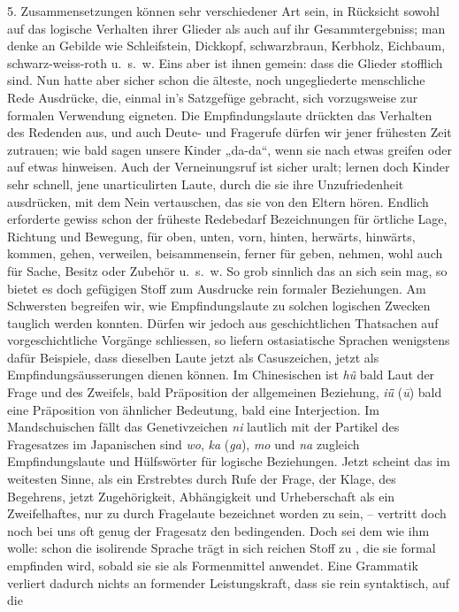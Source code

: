 \label{IV.III.II.4.5}5. Zusammensetzungen können sehr verschiedener Art sein, in Rücksicht sowohl auf das logische Verhalten ihrer Glieder  als \label{fp.329} auch auf ihr Gesammtergebniss; man denke an Gebilde wie Schleifstein, Dickkopf, schwarz\-\label{sp.347}braun, Kerbholz, Eichbaum, schwarz-weiss-roth u.~s.~w. Eins aber ist ihnen gemein: dass die Glieder  stofflich sind. Nun hatte aber sicher schon die älteste, noch ungegliederte menschliche Rede Ausdrücke, die, einmal in’s Satzgefüge gebracht, sich vorzugsweise zur formalen Verwendung eigneten. Die Empfindungslaute drückten das  Verhalten des Redenden aus, und auch Deute- und Fragerufe dürfen wir jener frühesten Zeit zutrauen; wie bald sagen unsere Kinder „da-da“, wenn sie nach etwas greifen oder auf etwas hinweisen. Auch der Verneinungsruf ist sicher uralt; lernen doch Kinder sehr schnell, jene unarticulirten Laute, durch die sie ihre Unzufriedenheit ausdrücken, mit dem Nein vertauschen, das sie von den Eltern hören. Endlich erforderte gewiss schon der früheste Redebedarf Bezeichnungen für örtliche Lage, Richtung und Bewegung, für oben, unten, vorn, hinten, herwärts, hinwärts, kommen, gehen, verweilen, beisammensein, ferner für geben, nehmen, wohl auch für Sache, Besitz oder Zubehör u.~s.~w. So grob sinnlich das an sich sein mag, so bietet es doch gefügigen Stoff zum Ausdrucke  rein formaler Beziehungen. Am Schwersten begreifen wir, wie Empfindungslaute zu solchen logischen Zwecken tauglich werden konnten. Dürfen wir jedoch aus geschichtlichen Thatsachen auf vorgeschichtliche Vorgänge schliessen, so liefern ostasiatische Sprachen wenigstens dafür Beispiele, dass dieselben Laute jetzt als Casuszeichen, jetzt als Empfindungsäusserungen dienen können. Im Chinesischen ist \textit{hû} bald Laut der Frage und des Zweifels, bald Präposition der allgemeinen Beziehung, \textit{iǖ} (\textit{ū}) bald eine Präposition von ähnlicher Bedeutung, bald eine Interjection. Im Mandschuischen fällt das Genetivzeichen \textit{ni} lautlich mit der Partikel des Fragesatzes  im Japanischen sind \textit{wo}, \textit{ka} (\textit{ga}), \textit{mo} und \textit{na} zugleich Empfindungslaute und Hülfswörter für logische Beziehungen. Jetzt scheint das  im weitesten Sinne, als ein Erstrebtes durch Rufe der Frage, der Klage, des Begehrens,  jetzt Zugehörigkeit, Abhängigkeit und Urheberschaft als ein Zweifelhaftes, nur zu  durch Fragelaute bezeichnet worden zu sein, – vertritt doch noch bei uns oft genug der Fragesatz den bedingenden. Doch sei dem wie ihm wolle: schon die isolirende Sprache trägt in sich reichen Stoff zu , die sie formal empfinden wird, sobald sie sie als Formenmittel anwendet. Eine Grammatik verliert dadurch nichts an formender Leistungskraft, dass sie \label{fp.330} rein syntaktisch, auf die 